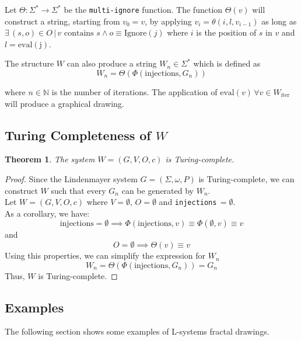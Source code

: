 \documentclass[a4paper]{article}
\newtheorem{theorem1}{Theorem}
\begin{document}
Let \(\Theta: \Sigma^* \to \Sigma^*\)
be the \texttt{multi-ignore} function.
The function \(\Theta(v)\) will construct a string,
starting from \(v_0 = v\), by applying \(v_i = \theta(i, l, v_{i-1})\)
as long as \(\exists\, (s, o) \in O \,|\, v \text{ contains } s \land
o\equiv \text{Ignore}(j)\) where \(i\) is the position of \(s\) in \(v\)
and \(l=\text{eval}(\text{j})\).

The structure \(W\) can also produce a string \(W_n \in \Sigma^*\)
which is defined as
\[
    W_n = \Theta(\Phi(\text{injections}, G_n))
\]

where \(n\in \mathbb{N}\) is the number of iterations.
The application of \(\text{eval}(v)\, \forall v\in W_\text{iter}\) will produce a graphical drawing.

\pagebreak

\subsection{Turing Completeness of \(W\)}


\begin{theorem1}
    The system \(W=(G, V, O, c)\) is Turing-complete.
\end{theorem1}
    
\begin{proof}
    Since the Lindenmayer system \(G=(\Sigma, \omega, P)\)
    is Turing-complete, we can construct \(W\) such that every \(G_n\)
    can be generated by \(W_n\). \\
    Let \(W=(G, V, O, c)\) where \(V = \emptyset\), \(O = \emptyset\)
    and \texttt{injections}\(\,=\emptyset\).
    \\
    As a corollary, we have:
    \[
        \text{injections} = \emptyset
        \implies \Phi(\text{injections}, v)
        \equiv \Phi(\emptyset, v) \equiv v  
    \]
    and
    \[
        O = \emptyset \implies
        \Theta(v) \equiv v
    \]
    Using this properties, we can simplify the expression for \(W_n\)
    \[
        W_n = \Theta(\Phi(\text{injections}, G_n))
        = G_n
    \]
    Thus, \(W\) is Turing-complete.
\end{proof}

\pagebreak

\subsection{Examples}

The following section shows some examples of L-systems
fractal drawings.
\end{document}
